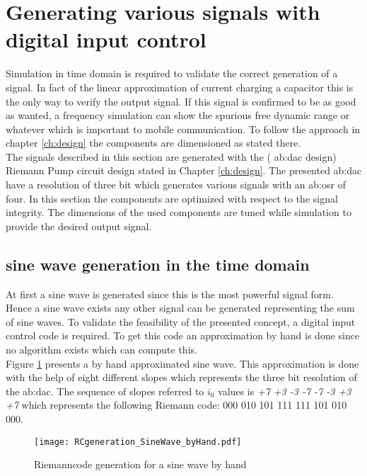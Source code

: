 \section{Generating various signals with digital input control}
Simulation in time domain is required to validate the correct generation of a signal. In fact of the linear approximation of current charging a capacitor this is the only way to verify the output signal. If this signal is confirmed to be as good as wanted, a frequency simulation can show the spurious free dynamic range or whatever which is important to mobile communication. To follow the approach in chapter \ref{ch:design} the components are dimensioned as stated there.\\
 The signals described in this section are generated with the ( \gls{ab:dac} design) Riemann Pump circuit design stated in Chapter \ref{ch:design}. The presented \gls{ab:dac} have a resolution of three bit which generates various signals with an \gls{ab:osr} of four. 
 In this section the components are optimized with respect to the signal integrity. The dimensions of the used components are tuned while simulation to provide the desired output signal.
 
\subsection{sine wave generation in the time domain}
At first a sine wave is generated since this is the most powerful signal form.
Hence a sine wave exists any other signal can be generated representing the sum of sine waves.
To validate the feasibility of the presented concept, a digital input control code is required.
To get this code an approximation by hand is done since no algorithm exists which can compute this.\\
Figure \ref{fig:SineWaveCodeGeneration} presents a by hand approximated sine wave.
This approximation is done with the help of eight different slopes which represents the three bit resolution of the \gls{ab:dac}. The sequence of slopes referred to $i_0$ values is \textit{+7 +3 -3 -7 -7 -3 +3 +7} which represents the following Riemann code:  000 010 101 111 111 101 010 000.
 
 \begin{figure}[htb!]
   \centering
   \texttt{[image: RCgeneration\_SineWave\_byHand.pdf]} %
   \caption{Riemanncode generation for a sine wave by hand}
   \label{fig:SineWaveCodeGeneration}
\end{figure}

